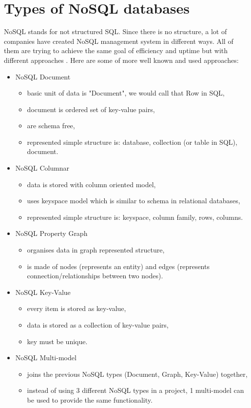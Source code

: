 \section{Types of NoSQL databases}

NoSQL stands for not structured SQL. Since there is no structure, a lot of companies have created NoSQL management system in different ways. All of them are trying to achieve the same goal of efficiency and uptime but with different approaches \parencite{web:Hackolade}. Here are some of more well known and used approaches:
\begin{itemize}
  \item NoSQL Document
  \begin{itemize}
      \item basic unit of data is "Document", we would call that Row in SQL,
      \item document is ordered set of key-value pairs,
      \item are schema free,
      \item represented simple structure is: database, collection (or table in SQL), document.
  \end{itemize}
  
  \item NoSQL Columnar
  \begin{itemize}
      \item data is stored with column oriented model,
      \item uses keyspace model which is similar to schema in relational databases,
      \item represented simple structure is: keyspace, column family, rows, columns.
  \end{itemize}
  
  \item NoSQL Property Graph
  \begin{itemize}
      \item organises data in graph represented structure,
      \item is made of nodes (represents an entity) and edges (represents connection/relationships between two nodes).
  \end{itemize}
  
  \item NoSQL Key-Value
  \begin{itemize}
      \item every item is stored as key-value,
      \item data is stored as a collection of key-value pairs,
      \item key must be unique.
  \end{itemize}
  
  \item NoSQL Multi-model
  \begin{itemize}
      \item joins the previous NoSQL types (Document, Graph, Key-Value) together,
      \item instead of using 3 different NoSQL types in a project, 1 multi-model can be used to provide the same functionality.
  \end{itemize}
\end{itemize}

